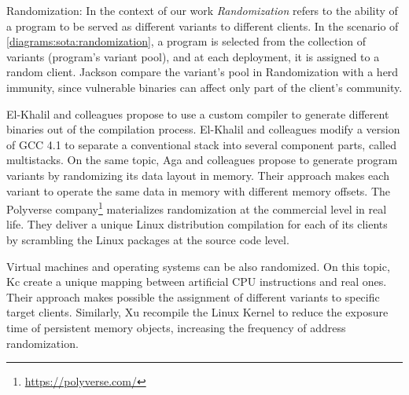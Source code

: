 
\begin{usage}{Randomization:}
    \label{usage:randomization}
    \normalfont
    In the context of our work \emph{Randomization} refers to the ability of a program to be served as different variants to different clients.
    In the scenario of \autoref{diagrams:sota:randomization}, a program is selected from the collection of variants (program's variant pool), and at each deployment, it is assigned to a random client. 
    Jackson \etal \cite{jackson} compare the variant's pool in Randomization with a herd immunity, since vulnerable binaries can affect only part of the client's community.

\end{usage}


El-Khalil and colleagues \cite{ElKhalil2004} propose to use a custom compiler to generate different binaries out of the compilation process. El-Khalil and colleagues modify a version of GCC 4.1 to separate a conventional stack into several component parts, called multistacks.
On the same topic, Aga and colleagues \cite{aga2019smokestack} propose to generate program variants by randomizing its data layout in memory. Their approach makes each variant to operate the same data in memory with different memory offsets.
The Polyverse company\footnote{\url{https://polyverse.com/}} materializes randomization at the commercial level in real life. They deliver a unique Linux distribution compilation for each of its clients by scrambling the Linux packages at the source code level.
    
Virtual machines and operating systems can be also randomized. On this topic, Kc \etal \cite{Kc03} create a unique mapping between artificial CPU instructions and real ones. Their approach makes possible the assignment of different variants to specific target clients. Similarly, Xu \etal \cite{xu2020merr} recompile the Linux Kernel to reduce the exposure time of persistent memory objects, increasing the frequency of address randomization.

%


